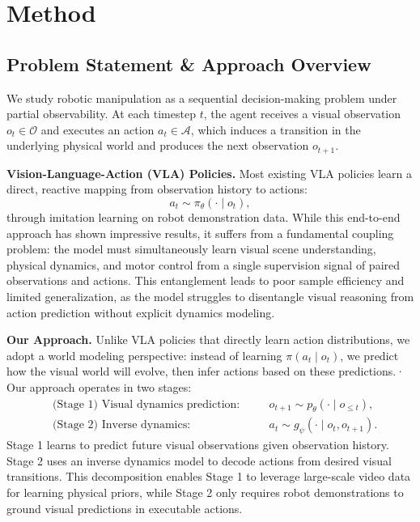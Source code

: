 \documentclass[onecolumn]{robbyant}           %
\begin{document}
\section{Method}
\subsection{Problem Statement \& Approach Overview}

We study robotic manipulation as a sequential decision-making problem under partial observability.
At each timestep $t$, the agent receives a visual observation $o_t \in \mathcal{O}$ and executes
an action $a_t \in \mathcal{A}$, which induces a transition in the underlying physical world and
produces the next observation $o_{t+1}$.

\noindent\textbf{Vision-Language-Action (VLA) Policies.}
Most existing VLA policies learn a direct, reactive mapping from observation history to actions:
\begin{equation}
a_t \sim \pi_\theta(\cdot \mid o_t),
\end{equation}
through imitation learning on robot demonstration data.
While this end-to-end approach has shown impressive results, it suffers from a fundamental
coupling problem: the model must simultaneously learn visual scene understanding, physical dynamics,
and motor control from a single supervision signal of paired observations and actions.
This entanglement leads to poor sample efficiency and limited generalization, as the model struggles
to disentangle visual reasoning from action prediction without explicit dynamics modeling.

\noindent\textbf{Our Approach.}
Unlike VLA policies that directly learn action distributions, we adopt a world modeling perspective:
instead of learning $\pi(a_t \mid o_t)$, we predict how the visual world will evolve,
then infer actions based on these predictions.·
Our approach operates in two stages:
\begin{equation}
\begin{aligned}
&\text{(Stage 1) Visual dynamics prediction:} \quad &&o_{t+1} \sim p_\theta(\cdot \mid o_{\le t}), \\
&\text{(Stage 2) Inverse dynamics:} \quad &&a_t \sim g_\psi(\cdot \mid o_t, o_{t+1}).
\end{aligned}
\end{equation}
Stage 1 learns to predict future visual observations given observation history.
Stage 2 uses an inverse dynamics model to decode actions from desired visual transitions.
This decomposition enables Stage 1 to leverage large-scale video data for learning physical priors,
while Stage 2 only requires robot demonstrations to ground visual predictions in executable actions.
\end{document}
